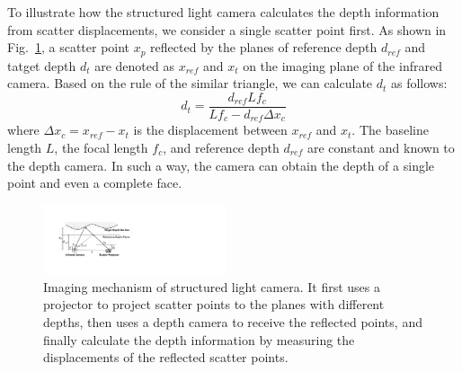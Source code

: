 To illustrate how the structured light camera calculates the depth information from scatter displacements, we consider a single scatter point first.
As shown in Fig.~\ref{imaging_mechanism}, a scatter point $x_p$ reflected by the planes of  reference depth $d_{ref}$ and tatget depth $d_t$ are denoted as $x_{ref}$ and $x_{t}$ on the imaging plane of the infrared camera.
Based on the rule of the similar triangle, we can calculate $d_t$ as follows:
\begin{equation}
	d_t= \frac{d_{ref}Lf_c}{Lf_c - d_{ref}\Delta x_c}
	\label{d_cal}
\end{equation}
where $\Delta x_c=x_{ref}-x_{t}$ is the displacement between $x_{ref}$ and $x_{t}$. The baseline length $L$, the focal length $f_c$, and reference depth $d_{ref}$ are constant and known to the depth camera. In such a way, the camera can obtain the depth of a single point and even a complete face.

%


\begin{figure}[!t]
	\centering
	\includegraphics[width=0.48\textwidth]{figures/imaging_mechanism.pdf} 
	\vspace{-0.1in}
	\caption{Imaging mechanism of structured light camera. It first uses a projector to project scatter points to the planes with different depths, then uses a depth camera to receive the reflected points, and finally calculate the depth information by measuring the displacements of the reflected scatter points.}
	\label{imaging_mechanism}
	\vspace{-0.15in}
\end{figure}

